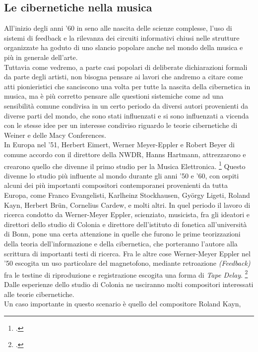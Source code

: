 \subsection{Le cibernetiche nella musica}
\label{sec:Le cibernetiche nella musica}
All'inizio degli anni '60 in seno alle nascita delle scienze complesse,
l'uso di sistemi di feedback e la rilevanza dei circuiti informativi chiusi
nelle strutture organizzate
ha goduto di uno slancio popolare anche nel mondo della musica
e più in generale dell'arte. \\
Tuttavia come vedremo, a parte casi popolari di deliberate dichiarazioni
formali da parte degli artisti, non bisogna pensare ai lavori che andremo a citare
come atti pionieristici che sanciscono una volta per tutte la nascita della cibernetica in musica,
ma è più corretto pensare alle questioni sistemiche come ad una sensibilità
comune condivisa in un certo periodo da diversi autori provenienti da diverse parti del mondo,
che sono stati influenzati e si sono influenzati a vicenda
con le stesse idee per un interesse condiviso riguardo
le teorie cibernetiche di Weiner e delle Macy Conferences. \\
In Europa nel '51, Herbert Eimert, Werner Meyer-Eppler e Robert Beyer
di comune accordo con il direttore della NWDR, Hanns Hartmann,
attrezzarono e crearono quello che divenne il primo studio per la Musica Elettronica. 
\footcite{discipiocircuitideltempo}
Questo divenne lo studio più influente al mondo durante gli anni '50 e '60,
con ospiti alcuni dei più importanti compositori contemporanei provenienti da tutta Europa,
come Franco Evangelisti, Karlheinz Stockhausen, György Ligeti, Roland Kayn, Herbert Brün,
Cornelius Cardew, e molti altri.
In quel periodo il lavoro di ricerca condotto da Werner-Meyer Eppler,
scienziato, musicista, fra gli ideatori e direttori dello studio di Colonia e
direttore dell'istituto di fonetica all'università di Bonn,
pone una certa attenzione in quelle che furono le prime
teorizzazioni della teoria dell'informazione e della cibernetica,
che porteranno l'autore alla scrittura di importanti testi di ricerca.
Fra le altre cose Werner-Meyer Eppler nel '50 escogita un uso particolare
del magnetofono, mediante retroazione \textit{(Feedback)} fra le testine di riproduzione e 
registrazione escogita una forma di \textit{Tape Delay}. \footcite{discipiocircuitideltempo}
Dalle esperienze dello studio di Colonia ne usciranno molti compositori interessati
alle teorie cibernetiche. \\
Un caso importante in questo scenario è quello del compositore Roland Kayn,
